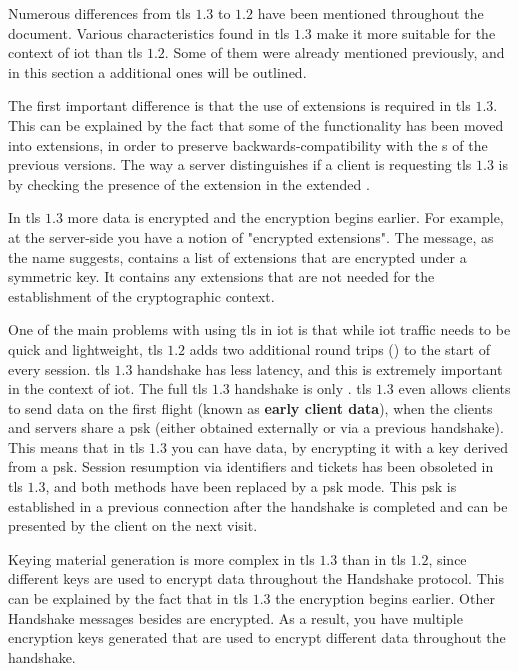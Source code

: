 \documentclass{llncs}
\begin{document}
{Numerous differences from \gls{tls} $1.3$ to $1.2$ have been mentioned throughout the document.
Various characteristics found in \gls{tls} $1.3$ make it more suitable for the context
of \gls{iot} than \gls{tls} $1.2$. Some of them were already mentioned previously, and in this section a additional ones will be outlined.

The first important difference is that the use of extensions is required in \gls{tls} $1.3$.
This can be explained by the fact that some of the functionality has been moved into extensions, in order to preserve
backwards-compatibility with the s of the previous versions.
The way a server distinguishes if a client is requesting \gls{tls} $1.3$
is by checking the presence of the  extension in the
extended .

In \gls{tls} $1.3$ more data is encrypted and the encryption begins earlier. For example,
at the server-side you have a notion of "encrypted extensions". The 
message, as the name suggests, contains a list of extensions that are encrypted
under a symmetric key. It contains any extensions that are not needed
for the establishment of the cryptographic context.

One of the main problems with using \gls{tls} in \gls{iot} is that while \gls{iot}
traffic needs to be quick and lightweight, \gls{tls} $1.2$ adds two additional
round trips () to the start of every session. \gls{tls} $1.3$ handshake has less latency,
and this is extremely important in the context of \gls{iot}.
The full \gls{tls} $1.3$ handshake is only . \gls{tls} $1.3$ even allows
clients to send data on the first flight (known as \textbf{early client data}), when the clients
and servers share a \gls{psk} (either obtained externally or via a previous handshake).
This means that in \gls{tls} $1.3$ you can have  data, by
encrypting it with a key derived from a \gls{psk}. Session resumption
via identifiers and tickets has been obsoleted in \gls{tls} $1.3$, and both methods
have been replaced by a \gls{psk} mode. This \gls{psk} is established in a previous
connection after the handshake is completed and can be presented by the client
on the next visit.

Keying material generation is more complex in \gls{tls} $1.3$ than in
\gls{tls} $1.2$, since different
keys are used to encrypt data throughout the Handshake protocol. This can be
explained by the fact that in \gls{tls} $1.3$ the encryption begins earlier.
Other Handshake messages besides  are encrypted. As a result,
you have multiple encryption keys generated that are used to encrypt different data
throughout the handshake.

}
\end{document}
